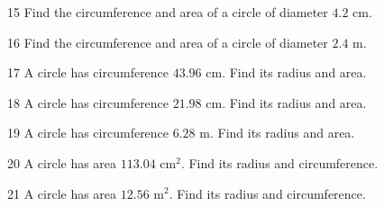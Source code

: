 \gap
\begin{probbox}{15}{\relax}
Find the circumference and area of a circle of diameter $4.2$ cm.
\end{probbox}
\gap
\begin{probbox}{16}{\relax}
Find the circumference and area of a circle of diameter $2.4$ m.
\end{probbox}
\gap
\begin{probbox}{17}{\relax}
A circle has circumference $43.96$ cm. Find its radius and area.
\end{probbox}
\gap
\begin{probbox}{18}{\relax}
A circle has circumference $21.98$ cm. Find its radius and area.
\end{probbox}
\gap
\begin{probbox}{19}{\relax}
A circle has circumference $6.28$ m. Find its radius and area.
\end{probbox}
\gap
\begin{probbox}{20}{\relax}
A circle has area $113.04$ cm$^2$. Find its radius and circumference.
\end{probbox}
\gap
\begin{probbox}{21}{\relax}
A circle has area $12.56$ m$^2$. Find its radius and circumference.
\end{probbox}
